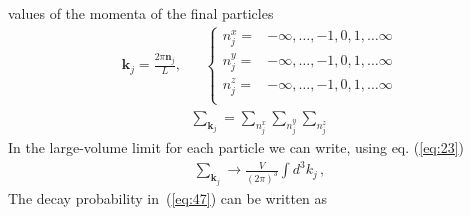 values of the momenta of the final particles
\begin{align}
  \mathbf{k}_j=\frac{2\pi\mathbf{n}_j}{L},& &
  \begin{cases}
   n_j^x=& -\infty,\ldots,-1,0,1,\ldots\infty\\
   n_j^y=& -\infty,\ldots,-1,0,1,\ldots\infty\\
   n_j^z=& -\infty,\ldots,-1,0,1,\ldots\infty\\
  \end{cases}
\end{align}
\begin{align}
  \sum_{\mathbf{k}_j}=\sum_{n_j^x}\sum_{n_j^y}\sum_{n_j^z}
\end{align}
In the large-volume limit
for each particle we can write, using eq. (\ref{eq:23})
\begin{align}
  \sum_{\mathbf{k}_j}
\to \frac{V}{(2\pi)^3}  \int d^3k_j\,,
\end{align}
The decay probability in~(\ref{eq:47}) can be written as

